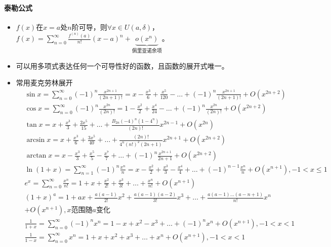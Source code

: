 \documentclass[
12pt, %
a4paper, 
oneside, %
headinclude,footinclude, %
]{scrartcl}
\begin{document}
\paragraph{泰勒公式}
\begin{itemize}
\item $ f(x) $在$ x = a $处$ n $阶可导，则$ \forall x \in U(a, \delta) $，
$ f(x) = \sum_{n = 0}^{\infty} \frac{f^{(n)}(a)}{n!}(x - a)^n + \underbrace{o(x^n)}_{\text{佩里亚诺余项}} $。
\item 可以用多项式表达任何一个可导性好的函数，且函数的展开式唯一。
\item 常用麦克劳林展开\label{sec:taylor}
\begin{align*}
&\sin x = \sum_{n = 0}^{\infty} (-1)^n \frac{x^{2n + 1}}{(2n + 1)!} = x - \frac{x^3}{6} + \frac{x^5}{120} - \dots + (-1)^n \frac{x^{2n + 1}}{(2n + 1)!} + O(x^{2n + 2}) \\
&\cos x = \sum_{n = 0}^{\infty} (-1)^n \frac{x^{2n}}{(2n)!} = 1 - \frac{x^2}{2} + \frac{x^4}{24} - \dots + (-1)^n \frac{x^{2n}}{(2n)!} + O(x^{2n + 2}) \\
&\tan x = x + \frac{x^3}{3} + \frac{2x^5}{15} + \dots + \frac{B_{2n} (-4)^n (1 - 4^n)}{(2n)!} x^{2n - 1} + O(x^{2n}) \\
&\arcsin x = x + \frac{x^3}{6} + \frac{3x^5}{40} + \dots + \frac{(2n)!}{4^n (n!)^2 (2n + 1)} x^{2n + 1} + O(x^{2n + 2}) \\
&\arctan x = x - \frac{x^3}{3} + \frac{x^5}{5} - \frac{x^7}{7} + \dots + (-1)^n \frac{x^{2n + 1}}{2n + 1} + O(x^{2n + 2}) \\
&\ln(1 + x) = \sum_{n = 1}^{\infty} (-1)^n \frac{x^n}{n} = x - \frac{x^2}{2} + \frac{x^3}{3} - \frac{x^4}{4} + \dots + (-1)^{n - 1} \frac{x^n}{n} + O(x^{n + 1}), -1 < x \leq 1 \\
&e^x = \sum_{n = 0}^{\infty} \frac{x^n}{n!} = 1 + x + \frac{x^2}{2!} + \frac{x^3}{3!} + \dots + \frac{x^n}{n!} + O(x^{n + 1}) \\
&(1 + x)^a = 1 + ax + \frac{a(a - 1)}{2!}x^2 + \frac{a(a - 1)(a - 2)}{3!}x^3 + \dots + \frac{a(a - 1)\dots(a - n + 1)}{n!}x^n \\
&+ O(x^{n + 1}), x \text{范围随} a \text{变化} \\
&\frac{1}{1 + x} = \sum_{n = 0}^{\infty} (-1)^n x^n = 1 - x + x^2 - x^3 + \dots + (-1)^n x^n + O(x^{n + 1}), -1 < x < 1 \\
&\frac{1}{1 - x} = \sum_{n = 0}^{\infty} x^n = 1 + x + x^2 + x^3 + \dots + x^n + O(x^{n + 1}), -1 < x < 1
\end{align*}
\end{itemize}
\end{document}
